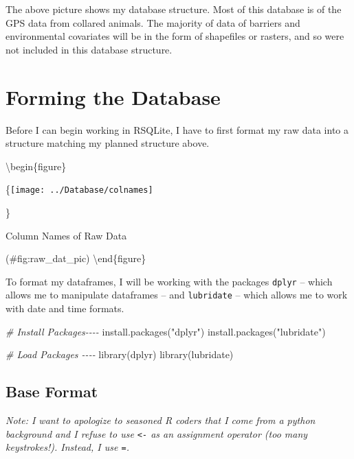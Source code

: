 \documentclass[
]{book}
\newenvironment{Shaded}{\begin{snugshade}}{\end{snugshade}}
\newcommand{\CommentTok}[1]{\textcolor[rgb]{0.56,0.35,0.01}{\textit{#1}}}
\newcommand{\FunctionTok}[1]{\textcolor[rgb]{0.00,0.00,0.00}{#1}}
\newcommand{\NormalTok}[1]{#1}
\newcommand{\StringTok}[1]{\textcolor[rgb]{0.31,0.60,0.02}{#1}}
\begin{document}
The above picture shows my database structure. Most of this database is of the GPS data from collared animals. The majority of data of barriers and environmental covariates will be in the form of shapefiles or rasters, and so were not included in this database structure.

\hypertarget{forming-the-database}{%
\section{Forming the Database}\label{forming-the-database}}

Before I can begin working in RSQLite, I have to first format my raw data into a structure matching my planned structure above.

\textbackslash begin\{figure\}

\{\centering \texttt{[image: ../Database/colnames]}

\}

\caption{Column Names of Raw Data}

(\#fig:raw\_dat\_pic)
\textbackslash end\{figure\}

To format my dataframes, I will be working with the packages \texttt{dplyr} -- which allows me to manipulate dataframes -- and \texttt{lubridate} -- which allows me to work with date and time formats.

\begin{Shaded}
\begin{Highlighting}[]
\CommentTok{\# Install Packages{-}{-}{-}{-}}
\FunctionTok{install.packages}\NormalTok{(}\StringTok{"dplyr"}\NormalTok{)}
\FunctionTok{install.packages}\NormalTok{(}\StringTok{"lubridate"}\NormalTok{)}
\end{Highlighting}
\end{Shaded}

\begin{Shaded}
\begin{Highlighting}[]
\CommentTok{\# Load Packages {-}{-}{-}{-}}
\FunctionTok{library}\NormalTok{(dplyr)}
\FunctionTok{library}\NormalTok{(lubridate)}
\end{Highlighting}
\end{Shaded}

\hypertarget{base-format}{%
\subsection{Base Format}\label{base-format}}

\emph{Note: I want to apologize to seasoned R coders that I come from a python background and I refuse to use \texttt{\textless{}-} as an assignment operator (too many keystrokes!). Instead, I use \texttt{=}.}
\end{document}
